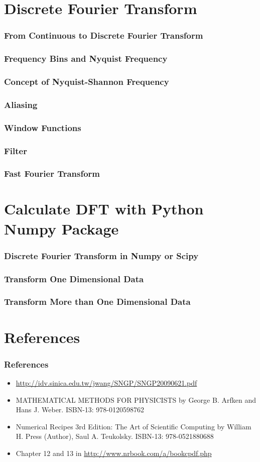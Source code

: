 \documentclass{beamer}
\begin{document}
\section{Discrete Fourier Transform}
\begin{frame}
\frametitle{From Continuous to Discrete Fourier Transform}
\end{frame}
\begin{frame}
\frametitle{Frequency Bins and Nyquist Frequency}
\end{frame}
\begin{frame}
\frametitle{Concept of Nyquist-Shannon Frequency}
\end{frame}
\begin{frame}
\frametitle{Aliasing}
\end{frame}
\begin{frame}
\frametitle{Window Functions}
\end{frame}
\begin{frame}
\frametitle{Filter}
\end{frame}
\begin{frame}
\frametitle{Fast Fourier Transform}
\end{frame}
\section{Calculate DFT with Python Numpy Package}
\begin{frame}
\frametitle{Discrete Fourier Transform in Numpy or Scipy}
\end{frame}
\begin{frame}
\frametitle{Transform One Dimensional Data}
\end{frame}
\begin{frame}
\frametitle{Transform More than One Dimensional Data}
\end{frame}
\section{References}
\begin{frame}
\frametitle{References}
\begin{itemize}
\item \url{http://idv.sinica.edu.tw/jwang/SNGP/SNGP20090621.pdf}
\item MATHEMATICAL METHODS FOR PHYSICISTS by George B. Arfken and Hans J. Weber. ISBN-13: 978-0120598762
\item Numerical Recipes 3rd Edition: The Art of Scientific Computing by William H. Press  (Author), Saul A. Teukolsky. ISBN-13: 978-0521880688
\item Chapter 12 and 13 in \url{http://www.nrbook.com/a/bookcpdf.php}
\end{itemize}
\end{frame}
\end{document}
